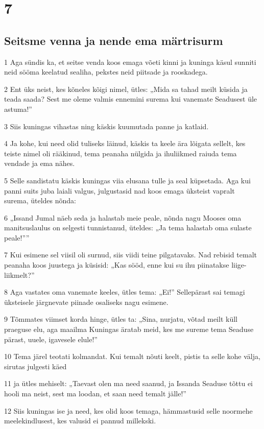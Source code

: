 \chapter{7}


\section*{Seitsme venna ja nende ema märtrisurm}

\par 1 Aga sündis ka, et seitse venda koos emaga võeti kinni ja kuninga käsul sunniti neid sööma keelatud sealiha, pekstes neid piitsade ja rooskadega.
\par 2 Ent üks neist, kes kõneles kõigi nimel, ütles: „Mida sa tahad meilt küsida ja teada saada? Sest me oleme valmis ennemini surema kui vanemate Seadusest üle astuma!”
\par 3 Siis kuningas vihastas ning käskis kuumutada panne ja katlaid.
\par 4 Ja kohe, kui need olid tuliseks läinud, käskis ta keele ära lõigata sellelt, kes teiste nimel oli rääkinud, tema peanaha nülgida ja ihuliikmed raiuda tema vendade ja ema nähes.
\par 5 Selle sandistatu käskis kuningas viia elusana tulle ja seal küpsetada. Aga kui panni suits juba laiali valgus, julgustasid nad koos emaga üksteist vapralt surema, üteldes nõnda:
\par 6 „Issand Jumal näeb seda ja halastab meie peale, nõnda nagu Mooses oma manitsuslaulus on selgesti tunnistanud, üteldes: „Ja tema halastab oma sulaste peale!””
\par 7 Kui esimene sel viisil oli surnud, siis viidi teine pilgatavaks. Nad rebisid temalt peanaha koos juustega ja küsisid: „Kas sööd, enne kui su ihu piinatakse liige-liikmelt?”
\par 8 Aga vastates oma vanemate keeles, ütles tema: „Ei!” Sellepärast sai temagi üksteisele järgnevate piinade osaliseks nagu esimene.
\par 9 Tõmmates viimset korda hinge, ütles ta: „Sina, nurjatu, võtad meilt küll praeguse elu, aga maailma Kuningas äratab meid, kes me sureme tema Seaduse pärast, uuele, igavesele elule!”
\par 10 Tema järel teotati kolmandat. Kui temalt nõuti keelt, pistis ta selle kohe välja, sirutas julgesti käed
\par 11 ja ütles mehiselt: „Taevast olen ma need saanud, ja Issanda Seaduse tõttu ei hooli ma neist, sest ma loodan, et saan need temalt jälle!”
\par 12 Siis kuningas ise ja need, kes olid koos temaga, hämmastusid selle noormehe meelekindlusest, kes valusid ei pannud millekski.
